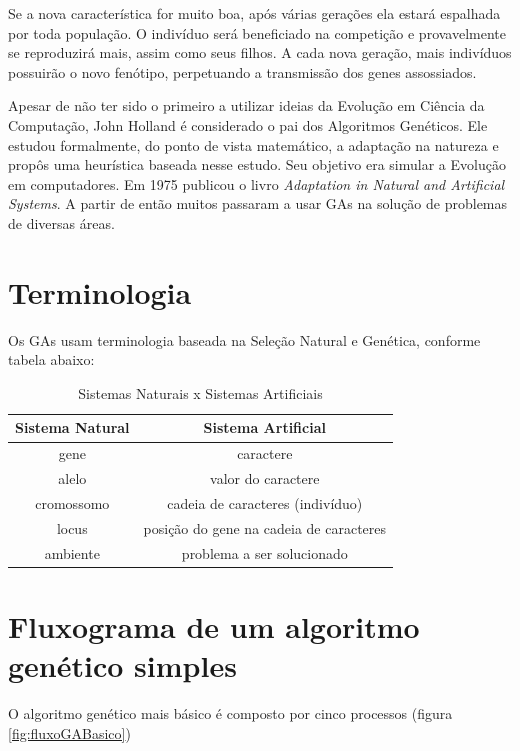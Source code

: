 Se a nova característica for muito boa, após várias gerações ela estará espalhada por toda população. O indivíduo será beneficiado na competição e provavelmente se reproduzirá mais, assim como seus filhos. A cada nova geração, mais indivíduos possuirão o novo fenótipo, perpetuando a transmissão dos genes assossiados. 

Apesar de não ter sido o primeiro a utilizar ideias da Evolução em Ciência da Computação, John Holland é considerado o pai dos Algoritmos Genéticos. Ele estudou formalmente, do ponto de vista matemático, a adaptação na natureza e propôs uma heurística baseada nesse estudo. Seu objetivo era simular a Evolução em computadores. Em 1975 publicou o livro \emph{Adaptation in Natural and Artificial Systems}. A partir de então muitos passaram a usar GAs na solução de problemas de diversas áreas.

\section{Terminologia}

Os GAs usam terminologia baseada na Seleção Natural e Genética, conforme tabela abaixo:
 
\begin{table}[htp]
	\caption{\label{tabSist}Sistemas Naturais x Sistemas Artificiais}
	\begin{center}
		\begin{tabular}{c|c}
			\hline
			\textbf{Sistema Natural}  & \textbf{Sistema Artificial} \\
			\hline
			gene				&			caractere																		\\
			alelo				&			valor do caractere													\\
			cromossomo	&			cadeia de caracteres (indivíduo)						\\ 
			locus				&			posição do gene na cadeia de caracteres			\\
			ambiente		&			problema a ser solucionado									\\
			\hline
		\end{tabular}
	\end{center}
\end{table}

\section{Fluxograma de um algoritmo genético simples}

O algoritmo genético mais básico é composto por cinco processos (figura \ref{fig:fluxoGABasico})

